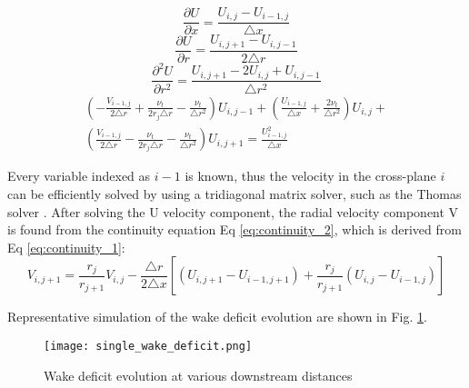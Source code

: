 \documentclass{umthesis}
\begin{document}
\begin{equation}\label{eq:du_dx}
  \frac{\partial U}{\partial x}=\frac{U_{i,j}-U_{i-1,j}}{\triangle x}
\end{equation}
\begin{equation}\label{eq:du_dr}
  \frac{\partial U}{\partial r}=\frac{U_{i,j+1}-U_{i,j-1}}{2 \triangle r}
\end{equation}
\begin{equation}\label{eq:du2_dr2}
  \frac{\partial^2 U}{\partial r^2}=\frac{U_{i,j+1}-2U_{i,j}+U_{i,j-1}}{\triangle r^2}
\end{equation}
\begin{equation}\label{eq:x_momentum_3}
  \begin{split}
  (- \frac{V _{i-1,j}}{2\triangle r}+\frac{\nu _t}{2r_j \triangle r}-\frac{\nu _t}{\triangle r^2})U_{i,j-1} +(\frac{U_{i-1,j}}{\triangle x}+\frac{2\nu _t}{\triangle r^2})U_{i,j}+ \\
  (\frac{V_{i-1,j}}{2\triangle r}-\frac{\nu _t}{2r_j\triangle r}-\frac{\nu _t}{\triangle r^2})U_{i,j+1}=\frac{U^2 _{i-1,j}}{\triangle x}
  \end{split}
\end{equation}



Every variable indexed as $i-1$ is known, thus the velocity in the cross-plane $i$ can be efficiently solved by using a tridiagonal matrix solver, such as the Thomas solver \cite{Thomas}. After solving the U velocity component, the radial velocity component V is found from the continuity equation Eq \ref{eq:continuity_2}, which is derived from Eq \ref{eq:continuity_1}:
\begin{equation}\label{eq:continuity_2}
V_{i,j+1}=\frac{r_j}{r_{j+1}}V_{i,j}-\frac{\triangle r}{2\triangle x}[(U_{i,j+1}-U_{i-1,j+1})+\frac{r_j}{r_{j+1}}(U_{i,j}-U_{i-1,j})]
\end{equation}

Representative simulation of the wake deficit evolution are shown in Fig. \ref{fig:wake_deficit}.

\begin{figure}
  \centering
  \texttt{[image: single\_wake\_deficit.png]}
  \caption{Wake deficit evolution at various downstream distances}\label{fig:wake_deficit}
\end{figure}

\end{document}
